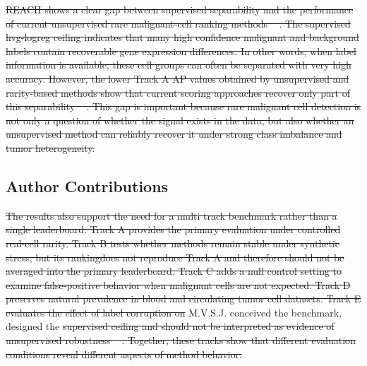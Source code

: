 \documentclass[10pt]{article}
\providecommand{\DIFaddtex}[1]{{\protect\color{trackgreen}#1}} %
\providecommand{\DIFdeltex}[1]{{\protect\color{red}\sout{#1}}}                      %
\providecommand{\DIFaddbegin}{} %
\providecommand{\DIFaddend}{} %
\providecommand{\DIFdelbegin}{} %
\providecommand{\DIFdelend}{} %
\providecommand{\DIFadd}[1]{\texorpdfstring{\DIFaddtex{#1}}{#1}} %
\providecommand{\DIFdel}[1]{\texorpdfstring{\DIFdeltex{#1}}{}} %
\newcommand{\DIFscaledelfig}{0.5}
\newlength{\DIFdelgraphicswidth} %
\newlength{\DIFdelgraphicsheight} %
\newcommand{\DIFaddincludegraphics}[2][]{{\color{trackgreen}\fbox{\DIFOincludegraphics[#1]{#2}}}} %
\newcommand{\DIFdelincludegraphics}[2][]{%
\sbox{\DIFdelgraphicsbox}{\DIFOincludegraphics[#1]{#2}}%
\settoboxwidth{\DIFdelgraphicswidth}{\DIFdelgraphicsbox} %
\settoboxtotalheight{\DIFdelgraphicsheight}{\DIFdelgraphicsbox} %
\scalebox{\DIFscaledelfig}{%
\parbox[b]{\DIFdelgraphicswidth}{\usebox{\DIFdelgraphicsbox}\\[-\baselineskip] \rule{\DIFdelgraphicswidth}{0em}}\llap{\resizebox{\DIFdelgraphicswidth}{\DIFdelgraphicsheight}{%
\setlength{\unitlength}{\DIFdelgraphicswidth}%
\begin{picture}(1,1)%
\thicklines\linethickness{2pt} %
{\color[rgb]{1,0,0}\put(0,0){\framebox(1,1){}}}%
{\color[rgb]{1,0,0}\put(0,0){\line( 1,1){1}}}%
{\color[rgb]{1,0,0}\put(0,1){\line(1,-1){1}}}%
\end{picture}%
}\hspace*{3pt}}} %
} %
\DeclareRobustCommand{\DIFaddbegin}{\DIFOaddbegin \let\includegraphics\DIFaddincludegraphics} %
\DeclareRobustCommand{\DIFaddend}{\DIFOaddend \let\includegraphics\DIFOincludegraphics} %
\DeclareRobustCommand{\DIFdelbegin}{\DIFOdelbegin \let\includegraphics\DIFdelincludegraphics} %
\DeclareRobustCommand{\DIFdelend}{\DIFOaddend \let\includegraphics\DIFOincludegraphics} %
\begin{document}
\DIFdelbegin \DIFdel{REACH shows a clear gap between supervised separability and the performance of current unsupervised rare malignant-cell ranking methods \mbox{%
\cite{abdelaal2019comparison,christensen2023evaluation}}\hskip0pt%
. The supervised hvg-logreg ceiling indicates that many high confidence malignant and background labels contain recoverable gene expression differences. In other words, when label information is available, these cell groups can often be separated with very high accuracy. However, the lower Track A AP values obtained by unsupervised and rarity-based methods show that current scoring approaches recover only part of this separability \mbox{%
\cite{lei2023self,martens2023rarity}}\hskip0pt%
. This gap is important because rare malignant cell detection is not only a question of whether the signal exists in the data, but also whether an unsupervised method can reliably recover it under strong class imbalance and tumor heterogeneity.
}\DIFdelend \DIFaddbegin \subsection{\DIFadd{Author Contributions}}\label{author-contributions}
\DIFaddend 

\DIFdelbegin \DIFdel{The results also support the need for a multi track benchmark rather than a single leaderboard. Track A provides the primary evaluation under controlled real-cell rarity. Track B tests whether methods remain stable under synthetic stress, but its rankingdoes not reproduce Track A and therefore should not be averaged into the primary leaderboard. Track C adds a null control setting to examine false-positive behavior when malignant cells are not expected. Track D preserves natural prevalence in blood and circulating tumor cell datasets. Track E evaluates the effect of label corruption on }\DIFdelend \DIFaddbegin \DIFadd{M.V.S.J. conceived the benchmark, designed }\DIFaddend the \DIFdelbegin \DIFdel{supervised ceiling and should not be interpreted as evidence of unsupervised robustness \mbox{%
\cite{cao2021benchmark,torre2018rare,mahalanabis2022evaluation}}\hskip0pt%
. Together,
  these tracks show that different evaluation conditions reveal different aspects of method behavior. }%
\end{document}
